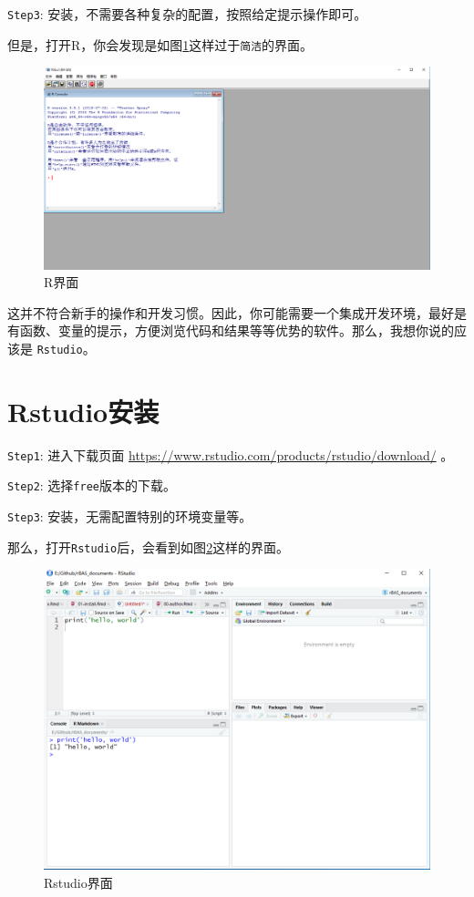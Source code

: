 \documentclass[]{ctexbook}
\theoremstyle{definition}
\theoremstyle{definition}
\theoremstyle{definition}
\theoremstyle{remark}
\begin{document}
\texttt{Step3}: 安装，不需要各种复杂的配置，按照给定提示操作即可。

但是，打开R，你会发现是如图\ref{fig:rface}这样过于\texttt{简洁}的界面。

\begin{figure}

{\centering \includegraphics[width=0.8\linewidth]{img/R} 

}

\caption{R界面}\label{fig:rface}
\end{figure}

这并不符合新手的操作和开发习惯。因此，你可能需要一个集成开发环境，最好是有函数、变量的提示，方便浏览代码和结果等等优势的软件。那么，我想你说的应该是
\texttt{Rstudio}。

\section{Rstudio安装}\label{Rstudioinstall}

\texttt{Step1}: 进入下载页面
\url{https://www.rstudio.com/products/rstudio/download/} 。

\texttt{Step2}: 选择\texttt{free}版本的下载。

\texttt{Step3}: 安装，无需配置特别的环境变量等。

那么，打开\texttt{Rstudio}后，会看到如图\ref{fig:rstudioface}这样的界面。

\begin{figure}

{\centering \includegraphics[width=0.8\linewidth]{img/Rstudio} 

}

\caption{Rstudio界面}\label{fig:rstudioface}
\end{figure}
\end{document}
